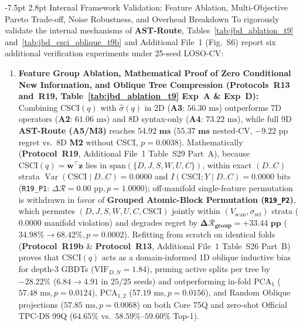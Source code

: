 \documentclass[10pt,a4paper]{article}
\makeatletter
\renewcommand\subsection{\@startsection{subsection}{2}{\z@}%
  {-7.5pt \@plus -2pt \@minus -1pt}%
  {2.8pt \@plus 1pt}%
  {\normalfont\normalsize\bfseries}}
\makeatother
\begin{document}
\subsection{Internal Framework Validation: Feature Ablation, Multi-Objective Pareto Trade-off, Noise Robustness, and Overhead Breakdown}
To rigorously validate the internal mechanisms of \textbf{AST-Route}, Tables~\ref{tab:jbd_ablation_t9} and~\ref{tab:jbd_csci_oblique_t9b} and Additional File~1 (Fig.~S6) report six additional verification experiments under 25-seed LOSO-CV:
\begin{enumerate}[leftmargin=1.5em,itemsep=1pt]
    \item \textbf{Feature Group Ablation, Mathematical Proof of Zero Conditional New Information, and Oblique Tree Compression (\textbf{Protocols~R13 and~R19}, Table~\ref{tab:jbd_ablation_t9} Exp~A \& Exp~D):} Combining $\text{CSCI}(q)$ with $\hat{\sigma}(q)$ in 2D (\textbf{A3}: $56.30\text{ ms}$) outperforms 7D operators (\textbf{A2}: $61.06\text{ ms}$) and 8D syntax-only (\textbf{A4}: $73.22\text{ ms}$), while full 9D \textbf{AST-Route (A5/M3)} reaches $\mathbf{54.92\text{ ms}}$ ($\mathbf{55.37\text{ ms}}$ nested-CV, $-9.22\text{ pp}$ regret vs.\ 8D \textbf{M2} without CSCI, $p=0.0038$). Mathematically (\textbf{Protocol~R19}, Additional File~1 Table~S29 Part~A), because $\text{CSCI}(q)=\mathbf{w}^{\top}\mathbf{z}$ lies in $\text{span}(\{D,J,S,W,U,C\})$, within exact $(D..C)$ strata $\operatorname{Var}(\text{CSCI}\mid D..C)=0.0000$ and $I(\text{CSCI};Y\mid D..C)=0.0000\text{ bits}$ (\texttt{R19\_P1}: $\Delta\mathcal{R}=0.00\text{ pp}, p=1.0000$); off-manifold single-feature permutation is withdrawn in favor of \textbf{Grouped Atomic-Block Permutation (\texttt{R19\_P2})}, which permutes $(D,J,S,W,U,C,\text{CSCI})$ jointly within $(V_{\text{scan}},\sigma_{\text{sel}})$ strata ($0.0000$ manifold violation) and degrades regret by $\mathbf{\Delta\mathcal{R}_{\text{group}}=+33.44\text{ pp}}$ ($34.98\%\rightarrow 68.42\%, p=0.0002$). Refitting from scratch on identical folds (\textbf{Protocol~R19b} \& \textbf{Protocol~R13}, Additional File~1 Table~S26 Part~B) proves that $\text{CSCI}(q)$ acts as a domain-informed 1D oblique inductive bias for depth-3 GBDTs ($\text{VIF}_{D,N}=1.84$), pruning active splits per tree by $\mathbf{-28.22\%}$ ($6.84\rightarrow 4.91$ in $25/25$ seeds) and outperforming in-fold $\text{PCA}_1$ ($57.48\text{ ms}, p=0.0124$), $\text{PCA}_{1,2}$ ($57.19\text{ ms}, p=0.0156$), and Random Oblique projections ($57.85\text{ ms}, p=0.0068$) on both Core 75Q and zero-shot Official TPC-DS 99Q ($64.65\%$ vs.\ $58.59\%\text{--}59.60\%$ Top-1).

\end{enumerate}
\end{document}
